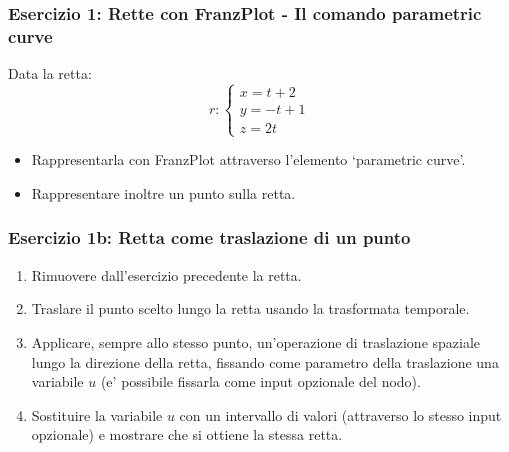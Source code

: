 \documentclass{beamer}
\newcommand{\frnzplt}{FranzPlot }
\begin{document}
%
\begin{frame}
\frametitle{Esercizio 1: Rette con \frnzplt - Il comando parametric curve}
Data la retta:
\begin{displaymath}
r:
\begin{cases}
x = t+2\\
y = -t+1\\
z = 2 t
\end{cases}
\end{displaymath}
\begin{itemize}
\item
Rappresentarla con \frnzplt attraverso l'elemento `parametric curve'.
\item Rappresentare inoltre un punto sulla retta.
\end{itemize}
\end{frame}
%
\begin{frame}
\frametitle{Esercizio 1b: Retta come traslazione di un punto}
\begin{enumerate}
\item Rimuovere dall'esercizio precedente la retta.
\item Traslare il punto scelto lungo la retta usando la trasformata temporale.
 \item Applicare, sempre allo stesso punto, un'operazione di traslazione
 spaziale lungo la direzione della retta, fissando come parametro della
 traslazione una variabile $u$ (e' possibile fissarla come input opzionale del
 nodo).
\item Sostituire la variabile $u$ con  un intervallo di valori (attraverso lo
stesso input opzionale) e mostrare che si ottiene la stessa retta.
\end{enumerate}
\end{frame}

%
\end{document}
